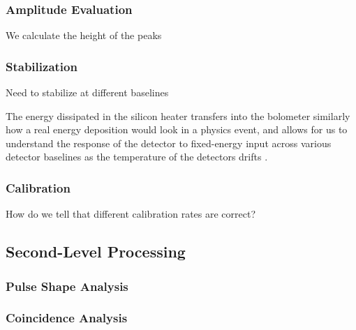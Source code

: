 \subsubsection{Amplitude Evaluation}
We calculate the height of the peaks
\subsubsection{Stabilization}
Need to stabilize at different baselines
\label{ssec:Stabilization}

The energy dissipated in the silicon heater transfers into the bolometer similarly how a real energy deposition would look in a physics event, and allows for us to understand the response of the detector to fixed-energy input across various detector baselines as the temperature of the detectors drifts \cite{ALESSANDRELLO1998454:Si-heater}.

\subsubsection{Calibration}
How do we tell that different calibration rates are correct?
\label{ssec:Calibration}
\subsection{Second-Level Processing}
\subsubsection{Pulse Shape Analysis}
\subsubsection{Coincidence Analysis}



